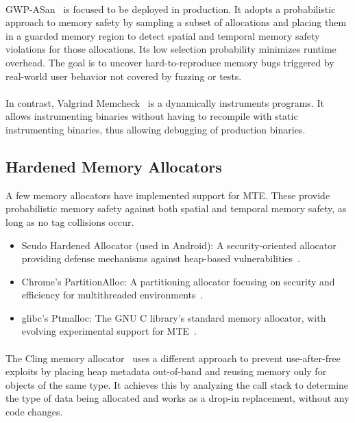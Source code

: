 \paragraph{}
GWP-ASan~\cite{serebryany2023gwp} is focused to be deployed in production.
It adopts a probabilistic approach to memory safety by sampling a subset of allocations and placing them in a guarded memory region to detect spatial and temporal memory safety violations for those allocations.
Its low selection probability minimizes runtime overhead.
The goal is to uncover hard-to-reproduce memory bugs triggered by real-world user behavior not covered by fuzzing or tests.

\paragraph{}
In contrast, Valgrind Memcheck~\cite{nethercote2007valgrind} is a dynamically instruments programs.
It allows instrumenting binaries without having to recompile with static instrumenting binaries, thus allowing debugging of production binaries.

\subsection{Hardened Memory Allocators}
\label{subsec:hardened-memory-allocators}

A few memory allocators have implemented support for \ac{MTE}.
These provide probabilistic memory safety against both spatial and temporal memory safety, as long as no tag collisions occur.

\begin{itemize}
    \item Scudo Hardened Allocator (used in Android): A security-oriented allocator providing defense mechanisms against heap-based vulnerabilities~\cite{scudo_allocator}.
    \item Chrome's PartitionAlloc: A partitioning allocator focusing on security and efficiency for multithreaded environments~\cite{chrome_partition_alloc}.
    \item glibc's Ptmalloc: The GNU C library's standard memory allocator, with evolving experimental support for \ac{MTE}~\cite{glibc_ptmalloc}.
\end{itemize}

\paragraph{}
The Cling memory allocator~\cite{akritidis2010cling} uses a different approach to prevent use-after-free exploits by placing heap metadata out-of-band and reusing memory only for objects of the same type.
It achieves this by analyzing the call stack to determine the type of data being allocated and works as a drop-in replacement, without any code changes.
